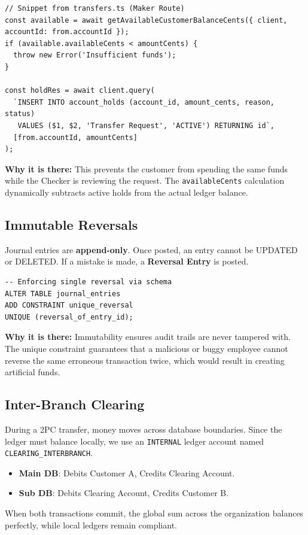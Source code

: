 \begin{lstlisting}[style=typescript]
// Snippet from transfers.ts (Maker Route)
const available = await getAvailableCustomerBalanceCents({ client, accountId: from.accountId });
if (available.availableCents < amountCents) {
  throw new Error('Insufficient funds');
}

const holdRes = await client.query(
  `INSERT INTO account_holds (account_id, amount_cents, reason, status)
   VALUES ($1, $2, 'Transfer Request', 'ACTIVE') RETURNING id`,
  [from.accountId, amountCents]
);
\end{lstlisting}

\textbf{Why it is there:} This prevents the customer from spending the same funds while the Checker is reviewing the request. The \texttt{availableCents} calculation dynamically subtracts active holds from the actual ledger balance.

\subsection{Immutable Reversals}
Journal entries are \textbf{append-only}. Once posted, an entry cannot be UPDATED or DELETED. If a mistake is made, a \textbf{Reversal Entry} is posted.

\begin{lstlisting}[style=sql]
-- Enforcing single reversal via schema
ALTER TABLE journal_entries 
ADD CONSTRAINT unique_reversal 
UNIQUE (reversal_of_entry_id);
\end{lstlisting}

\textbf{Why it is there:} Immutability ensures audit trails are never tampered with. The unique constraint guarantees that a malicious or buggy employee cannot reverse the same erroneous transaction twice, which would result in creating artificial funds.

\subsection{Inter-Branch Clearing}
During a 2PC transfer, money moves across database boundaries. Since the ledger must balance locally, we use an \texttt{INTERNAL} ledger account named \texttt{CLEARING\_INTERBRANCH}.
\begin{itemize}
    \item \textbf{Main DB}: Debits Customer A, Credits Clearing Account.
    \item \textbf{Sub DB}: Debits Clearing Account, Credits Customer B.
\end{itemize}
When both transactions commit, the global sum across the organization balances perfectly, while local ledgers remain compliant.
